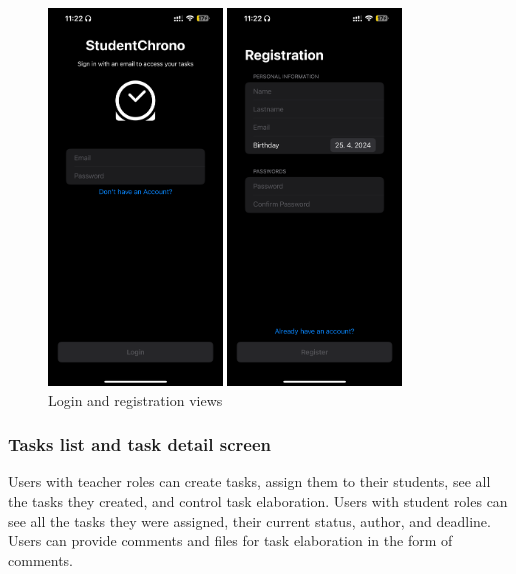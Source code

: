 \documentclass[
  biblatex = false,
  language=english,
  figures=false,
  sourcecodes,
  glossaries,
  index
]{kidiplom}
\begin{document}
\begin{figure}[h!]
\centering
\begin{minipage}[b]{0.4\textwidth}
	\includegraphics[height=10cm]{image6}
\end{minipage}
\begin{minipage}[b]{0.4\textwidth}
	\includegraphics[height=10cm]{image7}
\end{minipage}
\caption{Login and registration views}
\label{fig:image6-7}
\end{figure}

\subsubsection{Tasks list and task detail screen}
Users with teacher roles can create tasks,  assign them to their students, see all the tasks they created, and control task elaboration. Users with student roles can see all the tasks they were assigned, their current status, author, and deadline. Users can provide comments and files for task elaboration in the form of comments.
\end{document}
